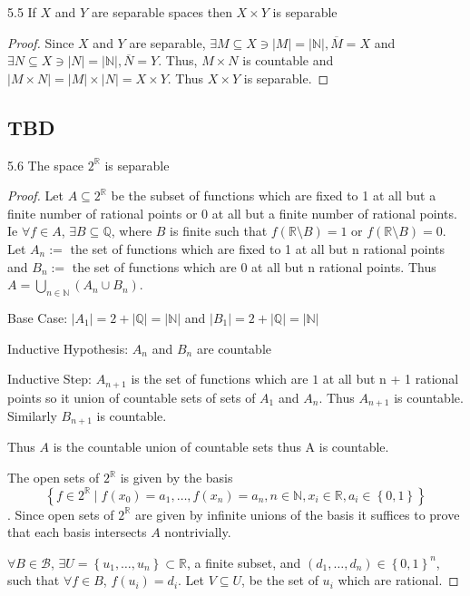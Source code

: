 \documentclass{article}
\newcommand*{\B}{\mathcal{B}}
\newcommand{\R}{\mathbb{R}}
\newcommand{\Q}{\mathbb{Q}}
\newcommand{\N}{\mathbb{N}}
\newcommand{\abs}[1]{\left\lvert #1\right\rvert}
\begin{document}
\bigskip

\begin{claim}{5.5}\label{Claim 5.5.}
    If $X$ and $Y$ are separable spaces then $X \times Y$ is separable   
\end{claim}
\begin{proof}
    Since $X$ and $Y$ are separable, $\exists M \subseteq X \ni |M| = |\N|, \overline{M} = X$ and $\exists N \subseteq X \ni \abs{N} =\abs{\N}, \overline{N} = Y$. Thus, $M \times N$ is countable and $\abs{M \times N} = \abs{M} \times \abs{N} = X\times Y$. Thus $X \times Y$ is separable.       
\end{proof} 

\bigskip

\subsection*{TBD}
\begin{claim}{5.6}\label{Claim 5.6.}
    The space $2^\R$ is separable 
\end{claim}
\begin{proof}
    Let $A \subseteq 2^{\R}$ be the subset of functions which are fixed to 1 at all but a finite number of rational points or 0 at all but a finite number of rational points. Ie $\forall f \in A$, $\exists B \subseteq \Q$, where $B$ is finite such that $f(\R \setminus B) = 1$ or $f(\R \setminus B) = 0$.       
    Let $A_{n} :=$ the set of functions which are fixed to 1 at all but n rational points and $B_n :=$ the set of functions which are 0 at all but n rational points. Thus $A = \bigcup_{n \in \N} (A_n \cup B_n)$. 
    
    Base Case: $|A_1| = 2 + |\Q| = |\N|$ and $|B_1| = 2 + |\Q| = |\N|$
    
    Inductive Hypothesis: $A_n$ and $B_n$ are countable
    
    Inductive Step: $A_{n + 1}$ is the set of functions which are $1$ at all but n + 1 rational points so it union of countable sets of sets of $A_1$ and $A_n$. Thus $A_{n + 1}$ is countable. Similarly $B_{n + 1}$ is countable. 
    
    
    Thus $A$ is the countable union of countable sets thus A is countable. 

    The open sets of $2^{\R}$ is given by the basis \[\left\{ f \in 2^{\R} \mid f(x_0) = a_1, \dots, f(x_n) = a_n, n \in \N, x_i \in \R, a_i \in \left\{ 0, 1 \right\} \right\}\]. Since open sets of $2^{\R}$ are given by infinite unions of the basis it suffices to prove that each basis intersects $A$ nontrivially.
    
    $\forall B \in \B$, $\exists U = \left\{ u_1, \dots, u_n \right\} \subset \R$, a finite subset, and $\left(d_1, \dots, d_n\right) \in \left\{ 0, 1 \right\}^n$, such that $\forall f \in B$, $f(u_i) = d_i$. Let $V \subseteq U$, be the set of $u_i$ which are rational.        
\end{proof}
\end{document}

